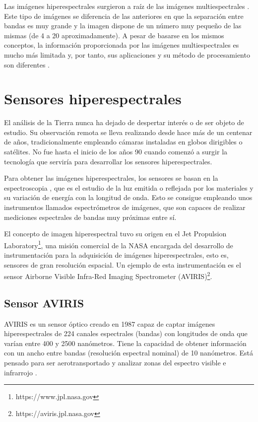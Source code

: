 Las imágenes hiperespectrales surgieron a raíz de las imágenes multiespectrales \cite{landgrebe2003stm}. Este tipo de imágenes se diferencia de las anteriores en que la separación entre bandas es muy grande y la imagen dispone de un número muy pequeño de las mismas (de 4 a 20 aproximadamente). A pesar de basarse en los mismos conceptos, la información proporcionada por las imágenes multiespectrales es mucho más limitada y, por tanto, sus aplicaciones y su método de procesamiento son diferentes \cite{biblio:TFM_Pablo_VCA}.

\section{Sensores hiperespectrales}

El análisis de la Tierra nunca ha dejado de despertar interés o de ser objeto de estudio. Su observación remota se lleva realizando desde hace más de un centenar de años, tradicionalmente empleando cámaras instaladas en globos dirigibles o satélites. No fue hasta el inicio de los años 90 cuando comenzó a surgir la tecnología que serviría para desarrollar los sensores hiperespectrales.

Para obtener las imágenes hiperespectrales, los sensores se basan en la espectroscopia \cite{biblio:TFG_Esquembri}, que es el estudio de la luz emitida o reflejada por los materiales y su variación de energía con la longitud de onda. Esto se consigue empleando unos instrumentos llamados espectrómetros de imágenes, que son capaces de realizar mediciones espectrales de bandas muy próximas entre sí.

El concepto de imagen hiperespectral tuvo su origen en el Jet Propulsion Laboratory\footnote{https://www.jpl.nasa.gov}, una misión comercial de la NASA encargada del desarrollo de instrumentación para la adquisición de imágenes hiperespectrales, esto es, sensores de gran resolución espacial. Un ejemplo de esta instrumentación es el sensor Airborne Visible Infra-Red Imaging Spectrometer (AVIRIS)\footnote{https://aviris.jpl.nasa.gov}.

\subsection{Sensor AVIRIS}

AVIRIS es un sensor óptico creado en 1987 capaz de captar imágenes hiperespectrales de 224 canales espectrales (bandas) con longitudes de onda que varían entre 400 y 2500 nanómetros. Tiene la capacidad de obtener información con un ancho entre bandas (resolución espectral nominal) de 10 nanómetros. Está pensado para ser aerotransportado y analizar zonas del espectro visible e infrarrojo \cite{biblio:result_aviris,biblio:aviris_analysis}.

